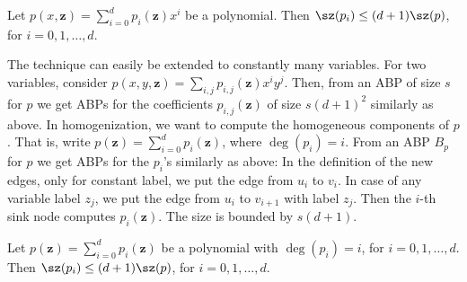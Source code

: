 \begin{ntlemma}
Let $p(x,\mathbf z)=\sum_{i=0}^dp_i(\mathbf z)x^i$ be a polynomial. Then $\sz(p_i)\leq(d+1)\sz(p)$, for $i=0,1,\ldots,d$.
\end{ntlemma}
The technique can easily be extended to constantly many variables. For two variables, consider $p(x,y,\mathbf z)=\sum_{i,j}p_{i,j}(\mathbf z)x^iy^j$. Then, from an ABP of size $s$ for $p$ we get ABPs for the coefficients $p_{i,j}(\mathbf z)$ of size $s(d+1)^2$ similarly as above.
In homogenization, we want to compute the homogeneous components of $p$. That is, write $p(\mathbf z)=\sum_{i=0}^dp_i(\mathbf z)$, where $\deg(p_i)=i$. From an ABP $B_p$ for $p$ we get ABPs for the $p_i$'s similarly as above: In the definition of the new edges, only for constant label, we put the edge from $u_i$ to $v_i$. In case of any variable label $z_j$, we put the edge from $u_i$ to $v_{i+1}$ with label $z_j$. Then the $i$-th sink node computes $p_i(\mathbf z)$. The size is bounded by $s(d+1)$.
\begin{ntlemma}
Let $p(\mathbf z)=\sum_{i=0}^dp_i(\mathbf z)$ be a polynomial with $\deg(p_i)=i$, for $i=0,1,\ldots,d$. Then $\sz(p_i)\leq(d+1)\sz(p)$, for $i=0,1,\ldots,d$.
\end{ntlemma}
